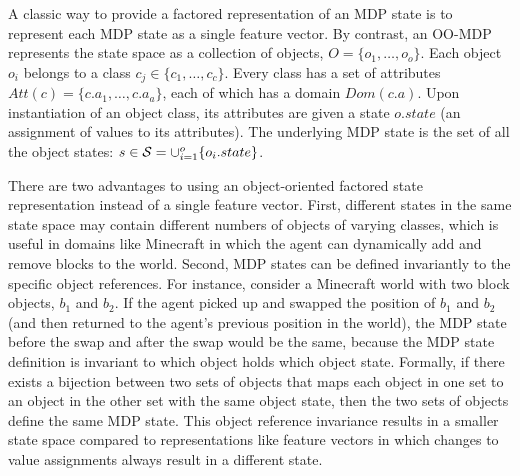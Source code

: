 \documentclass[]{article}
\begin{document}
A classic way to provide a factored representation of an MDP state is to represent
each MDP state as a single feature vector. By contrast, an OO-MDP represents the state space as a collection of objects,
$O = \{o_1, \ldots, o_o \}$.  Each object $o_i$ belongs to a
class $c_j \in  \{c_1, \ldots, c_c\}$. Every class has a set of attributes
$Att(c) = \{c.a_1, \ldots, c.a_a \}$, each of which has a domain $Dom(c.a)$.
Upon instantiation of an object class, its attributes are given a state $o.state$
(an assignment of values to its attributes).  The underlying MDP state is the set
of all the object states: $s \in {\cal S} = \cup_{i = 1}^o \{o_i.state\}$.

There are two advantages to using an object-oriented factored state
representation instead of a single feature vector. First, different
states in the same state space may contain different numbers of
objects of varying classes, which is useful in domains like Minecraft
in which the agent can dynamically add and remove blocks to the
world. Second, MDP states can be defined invariantly to the specific
object references.  For instance, consider a Minecraft world with two
block objects, $b_1$ and $b_2$.  If the agent picked up and swapped
the position of $b_1$ and $b_2$ (and then returned to the agent's
previous position in the world), the MDP state before the swap and
after the swap would be the same, because the MDP state definition is
invariant to which object holds which object state.  Formally, if
there exists a bijection between two sets of objects that maps each
object in one set to an object in the other set with the same object
state, then the two sets of objects define the same MDP state.  This
object reference invariance results in a smaller state space compared
to representations like feature vectors in which changes to value
assignments always result in a different state.
\end{document}
